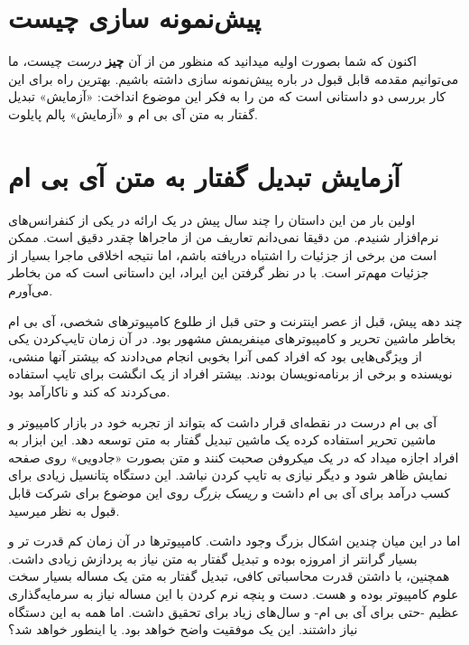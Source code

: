 \section{پیش‌نمونه سازی
چیست}\label{ux67eux6ccux634ux646ux645ux648ux646ux647-ux633ux627ux632ux6cc-ux686ux6ccux633ux62a}

اکنون که شما بصورت اولیه میدانید که منظور من از آن \textbf{چیز}
\emph{درست} چیست، ما می‌توانیم مقدمه قابل قبول در باره پیش‌نمونه سازی
داشته باشیم. بهترین راه برای این کار بررسی دو داستانی است که من را به
فکر این موضوع انداخت: «آزمایش» تبدیل گفتار به متن آی بی ام و «آزمایش»
پالم پایلوت.

\section{آزمایش تبدیل گفتار به متن آی بی
ام}\label{ux622ux632ux645ux627ux6ccux634-ux62aux628ux62fux6ccux644-ux6afux641ux62aux627ux631-ux628ux647-ux645ux62aux646-ux622ux6cc-ux628ux6cc-ux627ux645}

اولین بار من این داستان را چند سال پیش در یک ارائه در یکی از کنفرانس‌های
نرم‌افزار شنیدم. من دقیقا نمی‌دانم تعاریف من از ماجراها چقدر دقیق است.
ممکن است من برخی از جزئیات را اشتباه دریافته باشم، اما نتیجه اخلاقی
ماجرا بسیار از جزئیات مهم‌تر است. با در نظر گرفتن این ایراد، این داستانی
است که من بخاطر می‌آورم.

چند دهه پیش، قبل از عصر اینترنت و حتی قبل از طلوع کامپیوترهای شخصی، آی
بی ام بخاطر ماشین تحریر و کامپیوترهای مینفریمش مشهور بود. در آن زمان
تایپ‌کردن یکی از ویژگی‌هایی بود که افراد کمی آنرا بخوبی انجام می‌دادند
که بیشتر آنها منشی، نویسنده و برخی از برنامه‌نویسان بودند. بیشتر افراد
از یک انگشت برای تایپ استفاده می‌کردند که کند و ناکارآمد بود.

آی بی ام درست در نقطه‌ای قرار داشت که بتواند از تجربه خود در بازار
کامپیوتر و ماشین تحریر استفاده کرده یک ماشین تبدیل گفتار به متن توسعه
دهد. این ابزار به افراد اجازه میداد که در یک میکروفن صحبت کنند و متن
بصورت «جادویی» روی صفحه نمایش ظاهر شود و دیگر نیازی به تایپ کردن نباشد.
این دستگاه پتانسیل زیادی برای کسب درآمد برای آی بی ام داشت و \emph{ریسک
بزرگ} روی این موضوع برای شرکت قابل قبول به نظر میرسید.

اما در این میان چندین اشکال بزرگ وجود داشت. کامپیوترها در آن زمان کم
قدرت تر و بسیار گرانتر از امروزه بوده و تبدیل گفتار به متن نیاز به
پردازش زیادی داشت. همچنین، با داشتن قدرت محاسباتی کافی، تبدیل گفتار به
متن یک مساله بسیار سخت علوم کامپیوتر بوده و هست. دست و پنچه نرم کردن با
این مساله نیاز به سرمایه‌گذاری عظیم -حتی برای آی بی ام- و سال‌های زیاد
برای تحقیق داشت. اما همه به این دستگاه نیاز داشتند. این یک موفقیت واضح
خواهد بود. یا اینطور خواهد شد؟


